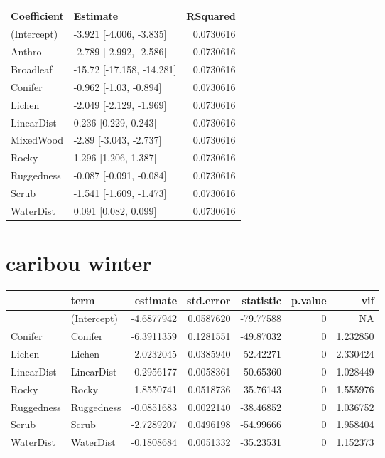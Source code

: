 \documentclass[]{article}
\begin{document}
\begin{tabular}{llr}
\toprule
Coefficient & Estimate & RSquared\\
\midrule
(Intercept) & -3.921 [-4.006, -3.835] & 0.0730616\\
Anthro & -2.789 [-2.992, -2.586] & 0.0730616\\
Broadleaf & -15.72 [-17.158, -14.281] & 0.0730616\\
Conifer & -0.962 [-1.03, -0.894] & 0.0730616\\
Lichen & -2.049 [-2.129, -1.969] & 0.0730616\\
LinearDist & 0.236 [0.229, 0.243] & 0.0730616\\
MixedWood & -2.89 [-3.043, -2.737] & 0.0730616\\
Rocky & 1.296 [1.206, 1.387] & 0.0730616\\
Ruggedness & -0.087 [-0.091, -0.084] & 0.0730616\\
Scrub & -1.541 [-1.609, -1.473] & 0.0730616\\
WaterDist & 0.091 [0.082, 0.099] & 0.0730616\\
\bottomrule
\end{tabular}

\section{caribou winter}\label{caribou-winter}

\begin{tabular}{llrrrrr}
\toprule
  & term & estimate & std.error & statistic & p.value & vif\\
\midrule
 & (Intercept) & -4.6877942 & 0.0587620 & -79.77588 & 0 & NA\\
Conifer & Conifer & -6.3911359 & 0.1281551 & -49.87032 & 0 & 1.232850\\
Lichen & Lichen & 2.0232045 & 0.0385940 & 52.42271 & 0 & 2.330424\\
LinearDist & LinearDist & 0.2956177 & 0.0058361 & 50.65360 & 0 & 1.028449\\
Rocky & Rocky & 1.8550741 & 0.0518736 & 35.76143 & 0 & 1.555976\\
Ruggedness & Ruggedness & -0.0851683 & 0.0022140 & -38.46852 & 0 & 1.036752\\
Scrub & Scrub & -2.7289207 & 0.0496198 & -54.99666 & 0 & 1.958404\\
WaterDist & WaterDist & -0.1808684 & 0.0051332 & -35.23531 & 0 & 1.152373\\
\bottomrule
\end{tabular}
\end{document}
